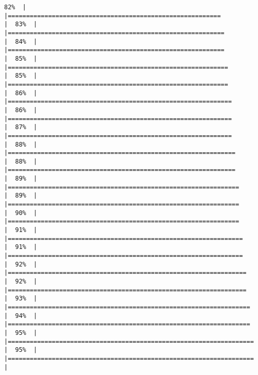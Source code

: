 \documentclass[
]{book}
\begin{document}
\begin{verbatim}
82%  |                                                                              |==========================================================            |  83%  |                                                                              |===========================================================           |  84%  |                                                                              |===========================================================           |  85%  |                                                                              |============================================================          |  85%  |                                                                              |============================================================          |  86%  |                                                                              |=============================================================         |  86%  |                                                                              |=============================================================         |  87%  |                                                                              |=============================================================         |  88%  |                                                                              |==============================================================        |  88%  |                                                                              |==============================================================        |  89%  |                                                                              |===============================================================       |  89%  |                                                                              |===============================================================       |  90%  |                                                                              |===============================================================       |  91%  |                                                                              |================================================================      |  91%  |                                                                              |================================================================      |  92%  |                                                                              |=================================================================     |  92%  |                                                                              |=================================================================     |  93%  |                                                                              |==================================================================    |  94%  |                                                                              |==================================================================    |  95%  |                                                                              |===================================================================   |  95%  |                                                                              |===================================================================   |  
\end{verbatim}
\end{document}
